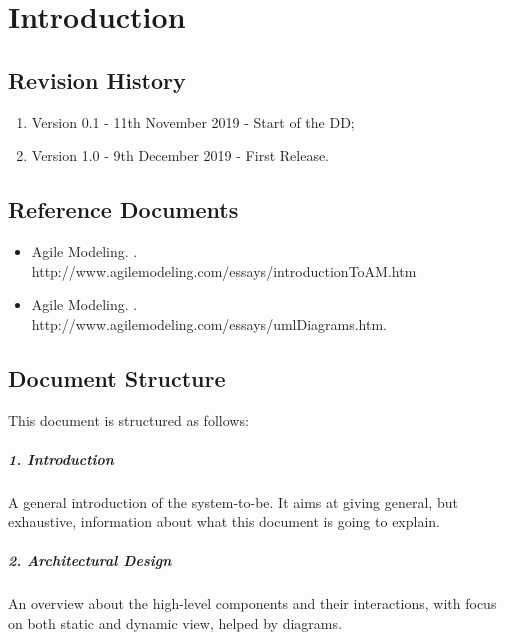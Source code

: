 \documentclass[../DD.tex]{subfiles}
\begin{document}
\chapter{Introduction}
\thispagestyle{fancy}
		
		
		
		
		\section{Revision History}
		\begin{enumerate}
			\item Version 0.1 - 11th November 2019 - Start of the DD;
			
			\item Version 1.0 - 9th December 2019 - First Release.
			
		\end{enumerate}
		\section{Reference Documents}
		\begin{itemize}
			\item Agile Modeling. . \\ http://www.agilemodeling.com/essays/introductionToAM.htm
			\item Agile Modeling. . \\ http://www.agilemodeling.com/essays/umlDiagrams.htm.
		\end{itemize}
		\section{Document Structure}
		This document is structured as follows:
		\paragraph{1. Introduction}
		A general introduction of the system-to-be. It aims at giving general, but exhaustive, information about what this document is going to explain.
		\paragraph{2. Architectural Design}
		An overview about the high-level components	and	their interactions, with focus on both static and dynamic view, helped by diagrams.
\end{document}
